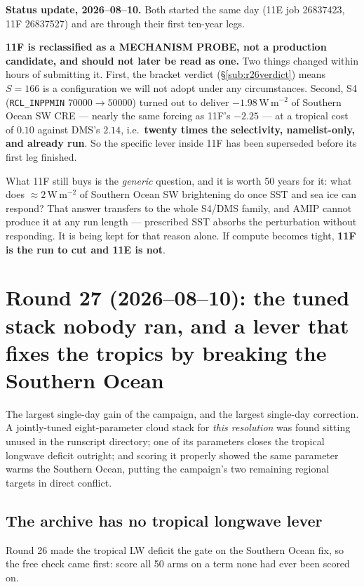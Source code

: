 \documentclass[10pt]{article}
\begin{document}
\textbf{Status update, 2026--08--10.} Both started the same day (11E job 26837423, 11F
26837527) and are through their first ten-year legs.

\textbf{11F is reclassified as a MECHANISM PROBE, not a production candidate, and should
not later be read as one.} Two things changed within hours of submitting it. First, the
bracket verdict (\S\ref{sub:r26verdict}) means $S=166$ is a configuration we will not
adopt under any circumstances. Second, S4 (\texttt{RCL\_INPPMIN} $70000\to50000$) turned
out to deliver $-1.98$\,W\,m$^{-2}$ of Southern Ocean SW CRE --- nearly the same forcing as
11F's $-2.25$ --- at a tropical cost of $0.10$ against DMS's $2.14$, i.e.\ \textbf{twenty
times the selectivity, namelist-only, and already run}. So the specific lever inside 11F
has been superseded before its first leg finished.

What 11F still buys is the \emph{generic} question, and it is worth 50 years for it: what
does ${\approx}2$\,W\,m$^{-2}$ of Southern Ocean SW brightening do once SST and sea ice can
respond? That answer transfers to the whole S4/DMS family, and AMIP cannot produce it at
any run length --- prescribed SST absorbs the perturbation without responding. It is being
kept for that reason alone. If compute becomes tight, \textbf{11F is the run to cut and
11E is not}.

\section{Round 27 (2026--08--10): the tuned stack nobody ran, and a lever that fixes the
tropics by breaking the Southern Ocean}\label{sec:r27}
The largest single-day gain of the campaign, and the largest single-day correction. A
jointly-tuned eight-parameter cloud stack for \emph{this resolution} was found sitting
unused in the runscript directory; one of its parameters closes the tropical longwave
deficit outright; and scoring it properly showed the same parameter warms the Southern
Ocean, putting the campaign's two remaining regional targets in direct conflict.

\subsection{The archive has no tropical longwave lever}\label{sub:r27scan}
Round 26 made the tropical LW deficit the gate on the Southern Ocean fix, so the free
check came first: score all 50 arms on a term none had ever been scored on.
\end{document}
